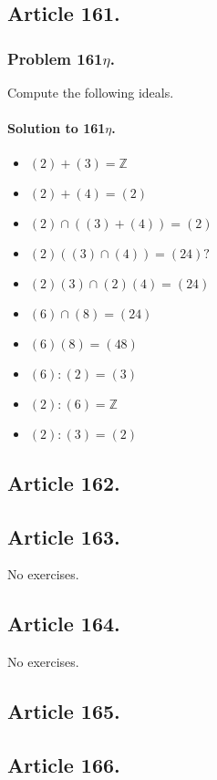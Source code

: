 \subsection{Article 161.}

\subsubsection{Problem 161$\eta$.}
Compute the following ideals.

\paragraph*{Solution to 161$\eta$.}
\begin{itemize}
\item $(2) + (3) = \mathbb{Z}$
\item $(2) + (4) = (2)$
\item $(2) \cap ((3) + (4)) = (2)$
\item $(2)((3) \cap (4)) = (24) ?$
\item $(2)(3) \cap (2)(4) = (24)$
\item $(6) \cap (8) = (24)$
\item $(6)(8) = (48)$
\item $(6) : (2) = (3)$
\item $(2) : (6) = \mathbb{Z}$
\item $(2) : (3) = (2)$
\end{itemize}
\subsection{Article 162.}

\subsection{Article 163.}

No exercises.
\subsection{Article 164.}

No exercises.
\subsection{Article 165.}

\subsection{Article 166.}

